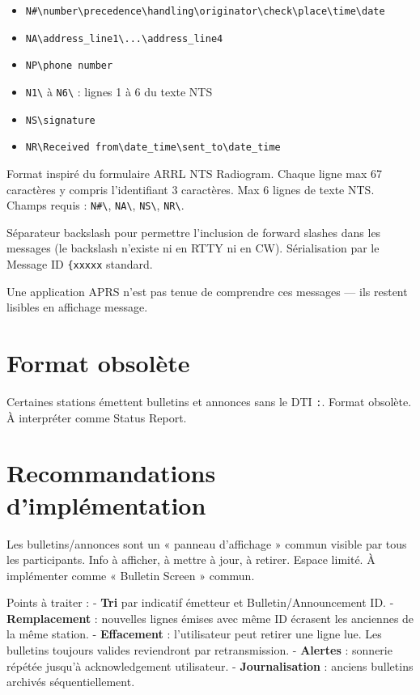 \begin{itemize}
\tightlist
\item
  \texttt{N\#\textbackslash{}number\textbackslash{}precedence\textbackslash{}handling\textbackslash{}originator\textbackslash{}check\textbackslash{}place\textbackslash{}time\textbackslash{}date}
\item
  \texttt{NA\textbackslash{}address\_line1\textbackslash{}...\textbackslash{}address\_line4}
\item
  \texttt{NP\textbackslash{}phone\ number}
\item
  \texttt{N1\textbackslash{}} à \texttt{N6\textbackslash{}} : lignes 1 à
  6 du texte NTS
\item
  \texttt{NS\textbackslash{}signature}
\item
  \texttt{NR\textbackslash{}Received\ from\textbackslash{}date\_time\textbackslash{}sent\_to\textbackslash{}date\_time}
\end{itemize}

Format inspiré du formulaire ARRL NTS Radiogram. Chaque ligne max 67
caractères y compris l'identifiant 3 caractères. Max 6 lignes de texte
NTS. Champs requis : \texttt{N\#\textbackslash{}},
\texttt{NA\textbackslash{}}, \texttt{NS\textbackslash{}},
\texttt{NR\textbackslash{}}.

Séparateur backslash pour permettre l'inclusion de forward slashes dans
les messages (le backslash n'existe ni en RTTY ni en CW). Sérialisation
par le Message ID \texttt{\{xxxxx} standard.

Une application APRS n'est pas tenue de comprendre ces messages --- ils
restent lisibles en affichage message.

\section{Format obsolète}\label{format-obsoluxe8te}

Certaines stations émettent bulletins et annonces sans le DTI
\texttt{:}. Format obsolète. À interpréter comme Status Report.

\section{Recommandations
d'implémentation}\label{recommandations-dimpluxe9mentation}

Les bulletins/annonces sont un « panneau d'affichage » commun visible
par tous les participants. Info à afficher, à mettre à jour, à retirer.
Espace limité. À implémenter comme « Bulletin Screen » commun.

Points à traiter : - \textbf{Tri} par indicatif émetteur et
Bulletin/Announcement ID. - \textbf{Remplacement} : nouvelles lignes
émises avec même ID écrasent les anciennes de la même station. -
\textbf{Effacement} : l'utilisateur peut retirer une ligne lue. Les
bulletins toujours valides reviendront par retransmission. -
\textbf{Alertes} : sonnerie répétée jusqu'à acknowledgement utilisateur.
- \textbf{Journalisation} : anciens bulletins archivés séquentiellement.

